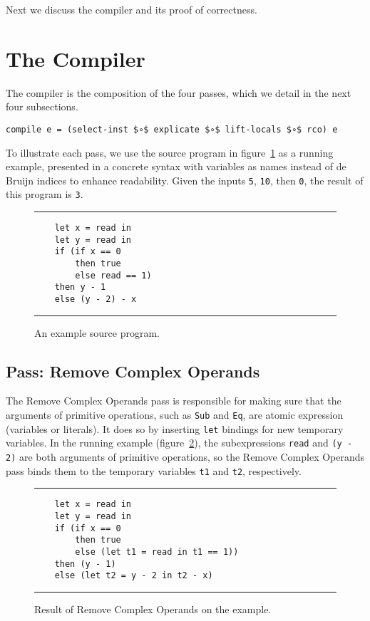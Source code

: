\documentclass[sigplan,review,dvipsnames,screen,10pt]{acmart}
\begin{document}
Next we discuss the compiler and its proof of correctness.


\section{The Compiler}
\label{sec:compiler}

The compiler is the composition of the four passes, which we detail in
the next four subsections.

\begin{lstlisting}[basicstyle=\ttfamily\footnotesize]
compile e = (select-inst $∘$ explicate $∘$ lift-locals $∘$ rco) e
\end{lstlisting}

To illustrate each pass, we use the source program in
figure~\ref{fig:running-example-source} as a running example,
presented in a concrete syntax with variables as names instead of de
Bruijn indices to enhance readability.  Given the inputs
\lstinline{5}, \lstinline{10}, then \lstinline{0}, the result of this
program is \lstinline{3}.

\begin{figure}[tp]
  \hrule
\begin{lstlisting}
    let x = read in
    let y = read in
    if (if x == 0
        then true
        else read == 1)
    then y - 1
    else (y - 2) - x
\end{lstlisting}
  \hrule
\caption{An example source program.}
\label{fig:running-example-source}
\end{figure}

\subsection{Pass: Remove Complex Operands}

The Remove Complex Operands pass is responsible for making sure that
the arguments of primitive operations, such as \lstinline{Sub} and
\lstinline{Eq}, are atomic expression (variables or literals). It does
so by inserting \lstinline{let} bindings for new temporary variables.
In the running example (figure~\ref{fig:running-example-monadic}), the
subexpressions \lstinline{read} and \lstinline{(y - 2)} are both
arguments of primitive operations, so the Remove Complex Operands pass
binds them to the temporary variables \lstinline{t1} and
\lstinline{t2}, respectively.

\begin{figure}[tp]
  \hrule
\begin{lstlisting}
    let x = read in
    let y = read in
    if (if x == 0
        then true
        else (let t1 = read in t1 == 1))
    then (y - 1)
    else (let t2 = y - 2 in t2 - x)
\end{lstlisting}
  \hrule
\caption{\small Result of Remove Complex Operands on the example.}
\label{fig:running-example-monadic}
\end{figure}
\end{document}
